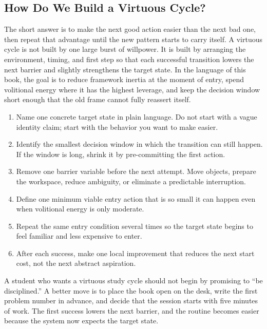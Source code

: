 \subsection{How Do We Build a Virtuous Cycle?}

The short answer is to make the next good action easier than the next bad
one, then repeat that advantage until the new pattern starts to carry itself.
A virtuous cycle is not built by one large burst of willpower. It is built by
arranging the environment, timing, and first step so that each successful
transition lowers the next barrier and slightly strengthens the target state.
In the language of this book, the goal is to reduce framework inertia at the
moment of entry, spend volitional energy where it has the highest leverage,
and keep the decision window short enough that the old frame cannot fully
reassert itself.

\begin{enumerate}[nosep]
  \item Name one concrete target state in plain language. Do not start with a
        vague identity claim; start with the behavior you want to make easier.
  \item Identify the smallest decision window in which the transition can
        still happen. If the window is long, shrink it by pre-committing the
        first action.
  \item Remove one barrier variable before the next attempt. Move objects,
        prepare the workspace, reduce ambiguity, or eliminate a predictable
        interruption.
  \item Define one minimum viable entry action that is so small it can happen
        even when volitional energy is only moderate.
  \item Repeat the same entry condition several times so the target state
        begins to feel familiar and less expensive to enter.
  \item After each success, make one local improvement that reduces the next
        start cost, not the next abstract aspiration.
\end{enumerate}

\begin{remark}
A student who wants a virtuous study cycle should not begin by promising to
``be disciplined.'' A better move is to place the book open on the desk, write
the first problem number in advance, and decide that the session starts with
five minutes of work. The first success lowers the next barrier, and the
routine becomes easier because the system now expects the target state.
\end{remark}
